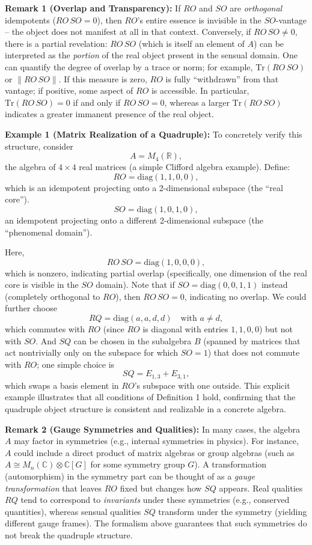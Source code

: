 \documentclass[12pt]{article}
\begin{document}
\medskip

\textbf{Remark 1 (Overlap and Transparency):} If $RO$ and $SO$ are \emph{orthogonal} idempotents ($RO\,SO = 0$), then $RO$’s entire essence is invisible in the $SO$-vantage -- the object does not manifest at all in that context. Conversely, if $RO\,SO \neq 0$, there is a partial revelation: $RO\,SO$ (which is itself an element of $A$) can be interpreted as the \emph{portion} of the real object present in the sensual domain. One can quantify the degree of overlap by a trace or norm; for example, $\mathrm{Tr}(RO\,SO)$ or $\|RO\,SO\|$. If this measure is zero, $RO$ is fully ``withdrawn'' from that vantage; if positive, some aspect of $RO$ is accessible. In particular, $\mathrm{Tr}(RO\,SO) = 0$ if and only if $RO\,SO=0$, whereas a larger $\mathrm{Tr}(RO\,SO)$ indicates a greater immanent presence of the real object.

\medskip

\textbf{Example 1 (Matrix Realization of a Quadruple):} To concretely verify this structure, consider 
\[
A = M_4(\mathbb{R}),
\]
the algebra of $4\times4$ real matrices (a simple Clifford algebra example). Define:
\[
RO = \mathrm{diag}(1,1,0,0),
\]
which is an idempotent projecting onto a 2-dimensional subspace (the ``real core''). 
\[
SO = \mathrm{diag}(1,0,1,0),
\]
an idempotent projecting onto a different 2-dimensional subspace (the ``phenomenal domain''). 

Here, 
\[
RO\,SO = \mathrm{diag}(1,0,0,0),
\]
which is nonzero, indicating partial overlap (specifically, one dimension of the real core is visible in the $SO$ domain). Note that if $SO = \mathrm{diag}(0,0,1,1)$ instead (completely orthogonal to $RO$), then $RO\,SO=0$, indicating no overlap. We could further choose 
\[
RQ = \mathrm{diag}(a,a,d,d) \quad \text{with } a\neq d,
\]
which commutes with $RO$ (since $RO$ is diagonal with entries $1,1,0,0$) but not with $SO$. And $SQ$ can be chosen in the subalgebra $B$ (spanned by matrices that act nontrivially only on the subspace for which $SO=1$) that does not commute with $RO$; one simple choice is 
\[
SQ = E_{1,3}+E_{3,1},
\]
which swaps a basis element in $RO$’s subspace with one outside. This explicit example illustrates that all conditions of Definition 1 hold, confirming that the quadruple object structure is consistent and realizable in a concrete algebra.

\medskip

\textbf{Remark 2 (Gauge Symmetries and Qualities):} In many cases, the algebra $A$ may factor in symmetries (e.g., internal symmetries in physics). For instance, $A$ could include a direct product of matrix algebras or group algebras (such as $A \cong M_n(\mathbb{C}) \otimes \mathbb{C}[G]$ for some symmetry group $G$). A transformation (automorphism) in the symmetry part can be thought of as a \emph{gauge transformation} that leaves $RO$ fixed but changes how $SQ$ appears. Real qualities $RQ$ tend to correspond to \emph{invariants} under these symmetries (e.g., conserved quantities), whereas sensual qualities $SQ$ transform under the symmetry (yielding different gauge frames). The formalism above guarantees that such symmetries do not break the quadruple structure.
\end{document}
